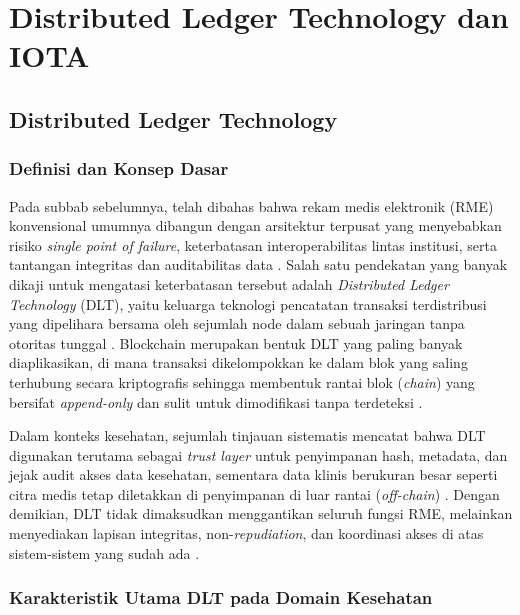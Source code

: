 \section{Distributed Ledger Technology dan IOTA}\label{sec:dlt-iota}

\subsection{Distributed Ledger Technology}

\subsubsection{Definisi dan Konsep Dasar}

Pada subbab sebelumnya, telah dibahas bahwa rekam medis elektronik (RME) konvensional umumnya dibangun dengan arsitektur terpusat yang menyebabkan risiko \emph{single point of failure}, keterbatasan interoperabilitas lintas institusi, serta tantangan integritas dan auditabilitas data \parencite{Ettaloui_2024_blockchain_ehr_slr,Mayer_2020_ehr_blockchain_slr}. 
Salah satu pendekatan yang banyak dikaji untuk mengatasi keterbatasan tersebut adalah \emph{Distributed Ledger Technology} (DLT), yaitu keluarga teknologi pencatatan transaksi terdistribusi yang dipelihara bersama oleh sejumlah node dalam sebuah jaringan tanpa otoritas tunggal \parencite{Mayer_2020_ehr_blockchain_slr}. 
Blockchain merupakan bentuk DLT yang paling banyak diaplikasikan, di mana transaksi dikelompokkan ke dalam blok yang saling terhubung secara kriptografis sehingga membentuk rantai blok (\emph{chain}) yang bersifat \emph{append-only} dan sulit untuk dimodifikasi tanpa terdeteksi \parencite{Ettaloui_2024_blockchain_ehr_slr,Mayer_2020_ehr_blockchain_slr}. 

Dalam konteks kesehatan, sejumlah tinjauan sistematis mencatat bahwa DLT digunakan terutama sebagai \emph{trust layer} untuk penyimpanan hash, metadata, dan jejak audit akses data kesehatan, sementara data klinis berukuran besar seperti citra medis tetap diletakkan di penyimpanan di luar rantai (\emph{off-chain}) \parencite{Ettaloui_2024_blockchain_ehr_slr,Mayer_2020_ehr_blockchain_slr}. 
Dengan demikian, DLT tidak dimaksudkan menggantikan seluruh fungsi RME, melainkan menyediakan lapisan integritas, non-\emph{repudiation}, dan koordinasi akses di atas sistem-sistem yang sudah ada \parencite{Yang_2021_blockchain_architecture_ehr,Ettaloui_2024_blockchain_ehr_slr}. 

\subsubsection{Karakteristik Utama DLT pada Domain Kesehatan}

